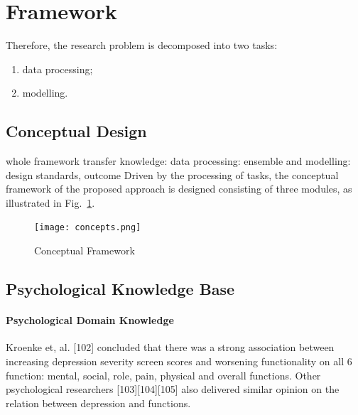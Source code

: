 \documentclass[runningheads]{llncs}
\begin{document}
\paragraph{}
%
%
%
\pagebreak
\section{Framework}
%
%
Therefore, the research problem is decomposed into two tasks: 
\begin{enumerate}
  \item data processing;
  \item modelling.
\end{enumerate}
%
\subsection{Conceptual Design}
%
%
whole framework
%
transfer knowledge:
data processing:
ensemble and modelling:
%
design standards, outcome
%
%
Driven by the processing of tasks, the conceptual framework of the proposed approach is designed consisting of three modules, as illustrated in Fig.~\ref{fig1}.
\begin{figure}[h]
\texttt{[image: concepts.png]}
\caption{Conceptual Framework} \label{fig1}
\end{figure}
%
%
\subsection{Psychological Knowledge Base}
%
\paragraph{Psychological Domain Knowledge}
Kroenke et, al. [102] concluded that there was a strong association between increasing depression severity screen scores and worsening functionality on all 6 function: mental, social, role, pain, physical and overall functions. Other psychological researchers [103][104][105] also delivered similar opinion on the relation between depression and functions. 
%
\end{document}
